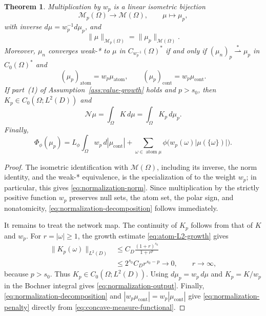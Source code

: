 \documentclass[11pt]{amsart}
\newtheorem{theorem}{Theorem}[section]
\theoremstyle{definition}
\theoremstyle{remark}
\DeclareMathOperator{\atom}{atom}
\DeclareMathOperator{\cont}{cont}
\begin{document}
\begin{theorem}
\label{thm:normalization}
Multiplication by $w_p$ is a linear isometric bijection
\begin{equation*}
	\mathcal M_p(\Omega)\longrightarrow\mathcal M(\Omega),
	\qquad \mu\longmapsto\mu_p,
\end{equation*}
with inverse $d\mu=w_p^{-1}d\mu_p$, and
\begin{equation}
\label{eq:normalization-norm}
	\|\mu\|_{\mathcal M_p(\Omega)}
	=\|\mu_p\|_{\mathcal M(\Omega)}.
\end{equation}
Moreover, $\mu_n$ converges weak-* to $\mu$ in
$C_{w_p^{-1}}(\Omega)^*$ if and only if
$(\mu_n)_p\overset{*}{\rightharpoonup}\mu_p$ in $C_0(\Omega)^*$ and
\begin{equation}
\label{eq:normalization-decomposition}
	(\mu_p)_{\atom}=w_p\mu_{\atom},
	\qquad
	(\mu_p)_{\cont}=w_p\mu_{\cont}.
\end{equation}
If part~(1) of Assumption~\ref{ass:value-growth} holds and $p>s_0$, then
$K_p\in C_0(\Omega;L^2(D))$ and
\begin{equation}
\label{eq:normalization-output}
	\mathcal N\mu
	=\int_\Omega K\,d\mu
	=\int_\Omega K_p\,d\mu_p.
\end{equation}
Finally,
\begin{equation}
\label{eq:normalization-penalty}
	\Phi_\phi(\mu_p)
	=L_\phi\int_\Omega w_p\,d|\mu_{\cont}|
	+\sum_{\omega\in\atom\mu}
	\phi\bigl(w_p(\omega)|\mu(\{\omega\})|\bigr).
\end{equation}
\end{theorem}
\begin{proof}
The isometric identification with $\mathcal M(\Omega)$, including its inverse,
the norm identity, and the weak-* equivalence, is the specialization of
\cite[Section~5.1]{bartolucci-et-al} to the weight $w_p$; in particular, this
gives \eqref{eq:normalization-norm}. Since multiplication by the strictly
positive function $w_p$ preserves null sets, the atom set, the polar sign, and
nonatomicity, \eqref{eq:normalization-decomposition} follows immediately.

It remains to treat the network map. The continuity of $K_p$ follows from
that of $K$ and $w_p$. For $r=|\omega|\ge1$, the growth estimate
\eqref{eq:atom-L2-growth} gives
\begin{align*}
	\|K_p(\omega)\|_{L^2(D)}
	&\le C_D\frac{(1+r)^{s_0}}{1+r^p}\\
	&\le 2^{s_0}C_D r^{s_0-p}\longrightarrow0,
	\qquad r\to\infty,
\end{align*}
because $p>s_0$. Thus $K_p\in C_0(\Omega;L^2(D))$. Using
$d\mu_p=w_p\,d\mu$ and $K_p=K/w_p$ in the Bochner integral gives
\eqref{eq:normalization-output}. Finally,
\eqref{eq:normalization-decomposition} and
$|w_p\mu_{\cont}|=w_p|\mu_{\cont}|$ give
\eqref{eq:normalization-penalty} directly from
\eqref{eq:concave-measure-functional}.
\end{proof}
\end{document}
